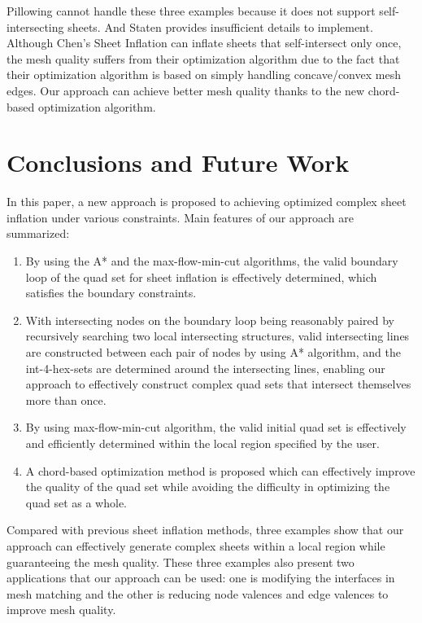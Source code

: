 \documentclass[final,5p,times,twocolumn]{elsarticle}
\begin{document}
Pillowing cannot handle these three examples because it does not support self-intersecting sheets. And Staten provides insufficient details to implement. Although Chen's Sheet Inflation can inflate sheets that self-intersect only once, the mesh quality suffers from their optimization algorithm due to the fact that their optimization algorithm is based on simply handling concave/convex mesh edges. Our approach can achieve better mesh quality thanks to the new chord-based optimization algorithm.

\section{Conclusions and Future Work}
In this paper, a new approach is proposed to achieving optimized complex sheet inflation under various constraints. Main features of our approach are summarized:

\begin{enumerate}
  \item By using the A* and the max-flow-min-cut algorithms, the valid boundary loop of the quad set for sheet inflation is effectively determined, which satisfies the boundary constraints.
  \item With intersecting nodes on the boundary loop being reasonably paired by recursively searching two local intersecting structures, valid intersecting lines are constructed between each pair of nodes by using A* algorithm, and the int-4-hex-sets are determined around the intersecting lines, enabling our approach to effectively construct complex quad sets that intersect themselves more than once.
  \item By using max-flow-min-cut algorithm, the valid initial quad set is effectively and efficiently determined within the local region specified by the user.
  \item A chord-based optimization method is proposed which can effectively improve the quality of the quad set while avoiding the difficulty in optimizing the quad set as a whole.
\end{enumerate}

Compared with previous sheet inflation methods, three examples show that our approach can effectively generate complex sheets within a local region while guaranteeing the mesh quality. These three examples also present two applications that our approach can be used: one is modifying the interfaces in mesh matching and the other is reducing node valences and edge valences to improve mesh quality.
\end{document}
